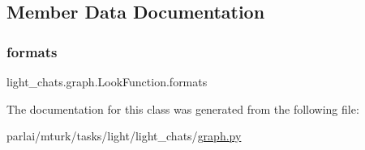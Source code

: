 \subsection{Member Data Documentation}
\mbox{\label{classlight__chats_1_1graph_1_1LookFunction_a98ca1312bcaf009a34ee3e1b1b43a3d6}} 
\subsubsection{\texorpdfstring{formats}{formats}}
{\footnotesize\ttfamily light\+\_\+chats.\+graph.\+Look\+Function.\+formats}



The documentation for this class was generated from the following file\+:\begin{DoxyCompactItemize}
\item 
parlai/mturk/tasks/light/light\+\_\+chats/\hyperlink{parlai_2mturk_2tasks_2light_2light__chats_2graph_8py}{graph.\+py}\end{DoxyCompactItemize}

